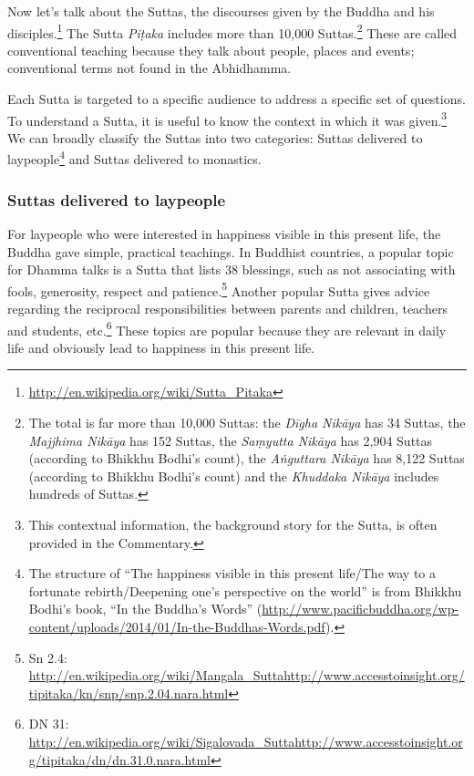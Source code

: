 Now let’s talk about the Suttas, the discourses given by the Buddha and his disciples.\footnote{\url{http://en.wikipedia.org/wiki/Sutta_Pitaka}} The Sutta \textit{Piṭaka} includes more than 10,000 Suttas.\footnote{The total is far more than 10,000 Suttas: the \textit{Dīgha Nikāya} has 34 Suttas, the \textit{Majjhima Nikāya} has 152 Suttas, the \textit{Saṃyutta Nikāya} has 2,904 Suttas (according to Bhikkhu Bodhi’s count), the \textit{Aṅguttara Nikāya} has 8,122 Suttas (according to Bhikkhu Bodhi’s count) and the \textit{Khuddaka Nikāya} includes hundreds of Suttas.} These are called conventional teaching because they talk about people, places and events; conventional terms not found in the Abhidhamma.

Each Sutta is targeted to a specific audience to address a specific set of questions. To understand a Sutta, it is useful to know the context in which it was given.\footnote{This contextual information, the background story for the Sutta, is often provided in the Commentary.} We can broadly classify the Suttas into two categories: Suttas delivered to laypeople\footnote{The structure of “The happiness visible in this present life/The way to a fortunate rebirth/Deepening one’s perspective on the world” is from Bhikkhu Bodhi’s book, “In the Buddha’s Words” (\url{http://www.pacificbuddha.org/wp-content/uploads/2014/01/In-the-Buddhas-Words.pdf}).} and Suttas delivered to monastics.

\subsubsection*{Suttas delivered to laypeople}

For laypeople who were interested in happiness visible in this present life, the Buddha gave simple, practical teachings. In Buddhist countries, a popular topic for Dhamma talks is a Sutta that lists 38 blessings, such as not associating with fools, generosity, respect and patience.\footnote{Sn 2.4: \url{http://en.wikipedia.org/wiki/Mangala_Sutta}\newline \url{http://www.accesstoinsight.org/tipitaka/kn/snp/snp.2.04.nara.html}} Another popular Sutta gives advice regarding the reciprocal responsibilities between parents and children, teachers and students, etc.\footnote{DN 31: \url{http://en.wikipedia.org/wiki/Sigalovada_Sutta}\newline \url{http://www.accesstoinsight.org/tipitaka/dn/dn.31.0.nara.html}} These topics are popular because they are relevant in daily life and obviously lead to happiness in this present life.

